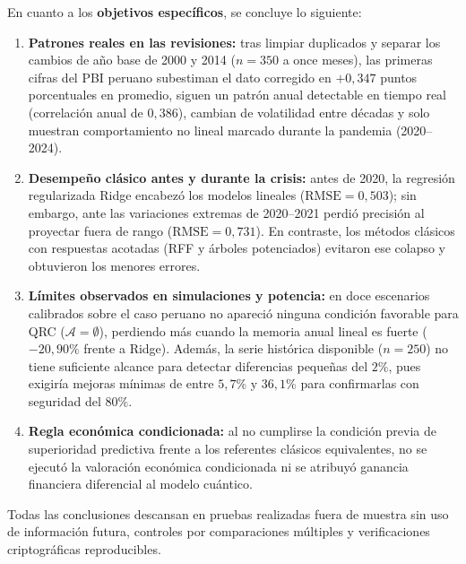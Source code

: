 En cuanto a los \textbf{objetivos específicos}, se concluye lo siguiente:
\begin{enumerate}
	\item \textbf{Patrones reales en las revisiones:} tras limpiar duplicados y separar los cambios de año base de 2000 y 2014 (\(n=350\) a once meses), las primeras cifras del PBI peruano subestiman el dato corregido en \(+0{,}347\) puntos porcentuales en promedio, siguen un patrón anual detectable en tiempo real (correlación anual de \(0{,}386\)), cambian de volatilidad entre décadas y solo muestran comportamiento no lineal marcado durante la pandemia (2020--2024).
	\item \textbf{Desempeño clásico antes y durante la crisis:} antes de 2020, la regresión regularizada Ridge encabezó los modelos lineales (\(\text{RMSE}=0{,}503\)); sin embargo, ante las variaciones extremas de 2020--2021 perdió precisión al proyectar fuera de rango (\(\text{RMSE}=0{,}731\)). En contraste, los métodos clásicos con respuestas acotadas (RFF y árboles potenciados) evitaron ese colapso y obtuvieron los menores errores.
	\item \textbf{Límites observados en simulaciones y potencia:} en doce escenarios calibrados sobre el caso peruano no apareció ninguna condición favorable para QRC (\(\mathcal{A}=\emptyset\)), perdiendo más cuando la memoria anual lineal es fuerte (\(-20{,}90\%\) frente a Ridge). Además, la serie histórica disponible (\(n=250\)) no tiene suficiente alcance para detectar diferencias pequeñas del \(2\%\), pues exigiría mejoras mínimas de entre \(5{,}7\%\) y \(36{,}1\%\) para confirmarlas con seguridad del \(80\%\).
	\item \textbf{Regla económica condicionada:} al no cumplirse la condición previa de superioridad predictiva frente a los referentes clásicos equivalentes, no se ejecutó la valoración económica condicionada ni se atribuyó ganancia financiera diferencial al modelo cuántico.
\end{enumerate}

Todas las conclusiones descansan en pruebas realizadas fuera de muestra sin uso de información futura, controles por comparaciones múltiples y verificaciones criptográficas reproducibles.
